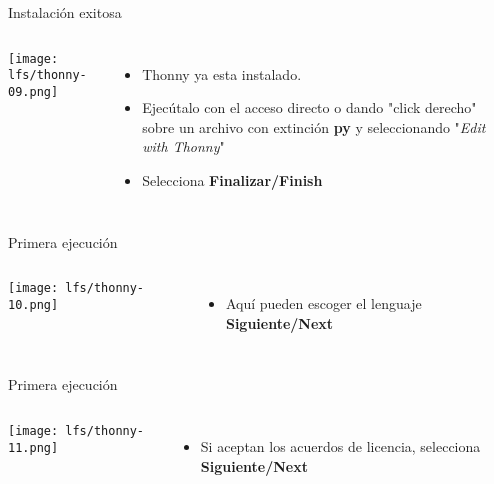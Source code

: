\begin{frame}[c]{Instalación exitosa}
    \begin{columns}
        \begin{center}
            \texttt{[image: lfs/thonny-09.png]}
        \end{center}
        \begin{itemize}
          \item Thonny ya esta instalado.
          \item Ejecútalo con el acceso directo o dando "click derecho"
            sobre un archivo con extinción \textbf{py} y seleccionando
            "\emph{Edit with Thonny}"
          \item Selecciona \textbf{Finalizar/Finish}
        \end{itemize}
    \end{columns}
\end{frame}

\begin{frame}[c]{Primera ejecución}
    \begin{columns}
        \begin{center}
            \texttt{[image: lfs/thonny-10.png]}
        \end{center}
        \begin{itemize}
          \item Aquí pueden escoger el lenguaje 
            \textbf{Siguiente/Next}
        \end{itemize}
    \end{columns}
\end{frame}

\begin{frame}[c]{Primera ejecución}
    \begin{columns}
        \begin{center}
            \texttt{[image: lfs/thonny-11.png]}
        \end{center}
        \begin{itemize}
          \item Si aceptan los acuerdos de licencia, selecciona
            \textbf{Siguiente/Next}
        \end{itemize}
    \end{columns}
\end{frame}

